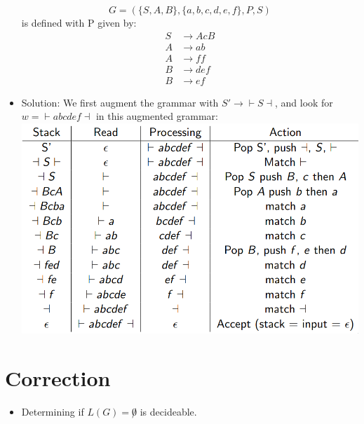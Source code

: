 \documentclass[12pt]{article}
\begin{document}
\begin{itemize}
        $$G = (\{S, A, B\}, \{a, b, c, d, e, f\}, P, S)$$ 
        is defined with P given by:
        \begin{align*}
            S &\rightarrow AcB \\
            A &\rightarrow ab\\
            A &\rightarrow ff\\
            B &\rightarrow def\\
            B &\rightarrow ef 
        \end{align*}
    \item Solution: We first augment the grammar with $S' \rightarrow \vdash S \dashv$, and look for $w = \vdash abcdef \dashv$ in this augmented grammar: \\
        \includegraphics[scale=0.4]{parsing.png}
\end{itemize}

\section{Correction}
\begin{itemize}
    \item Determining if $L(G) = \not0$ is decideable.
\end{itemize}
\end{document}
